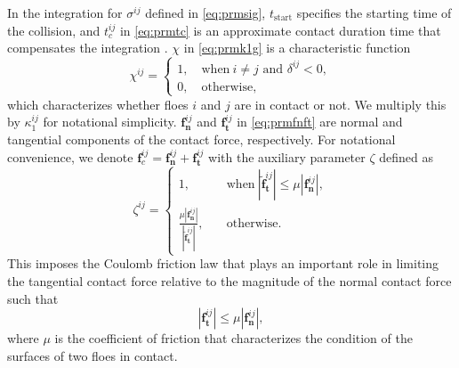 \documentclass[a4paper,11pt]{article}
\numberwithin{equation}{section}
\theoremstyle{definition}
\newcommand{\bfn}{\boldsymbol{n}}
\newcommand{\bft}{\boldsymbol{t}}
\newcommand{\bff}{\boldsymbol{f}}
\begin{document}
In the integration for $\sigma^{ij}$ defined in \eqref{eq:prmsig}, $t_\text{start}$ specifies the starting time of the collision, and $t_c^{ij}$ in \eqref{eq:prmtc} is an approximate contact duration time that compensates the integration \cite{gugan2000inelastic}.
$\chi$ in \eqref{eq:prmk1g} is a characteristic function
\begin{equation} \label{eq:chi}
\chi^{ij} = 
\begin{cases}
1, \quad \text{when} \ i\ne j\text{ and }\delta^{ij}<0, \\
0, \quad \text{otherwise},
\end{cases}
\end{equation}
which characterizes whether floes $i$ and $j$ are in contact or not. 
We multiply this by $\kappa_1^{ij}$ for notational simplicity. 
%
$\bff_{\bfn}^{ij}$ and $\bff_{\bft}^{ij}$ in \eqref{eq:prmfnft} are normal and tangential components of the contact force, respectively.
For notational convenience, we denote
$
\bff_c^{ij} = \bff_{\bfn}^{ij} + \bff_{\bft}^{ij}
$
with the auxiliary parameter $\zeta$ defined as
%
\begin{equation} \label{eq:zeta}
\zeta^{ij} = 
\begin{cases}
1, \quad & \text{when} \ |\tilde{\bff}_{\bft}^{ij}| \leq \mu |\bff_{\bfn}^{ij}|, \\
\frac{\mu |\bff_{\bfn}^{ij}|}{|\tilde{\bff}_{\bft}^{ij}| }, \quad & \text{otherwise}.
\end{cases}
\end{equation}
This imposes the Coulomb friction law that plays an important role in limiting the tangential contact force relative to the magnitude of the normal contact force \cite{hopkins2004discrete} such that
\begin{equation*} %
|\bff_{\bft}^{ij}| \leq \mu|\bff_{\bfn}^{ij}|,
\end{equation*}
 where $\mu$ is the coefficient of friction that characterizes the condition of the surfaces of two floes in contact. 
\end{document}
